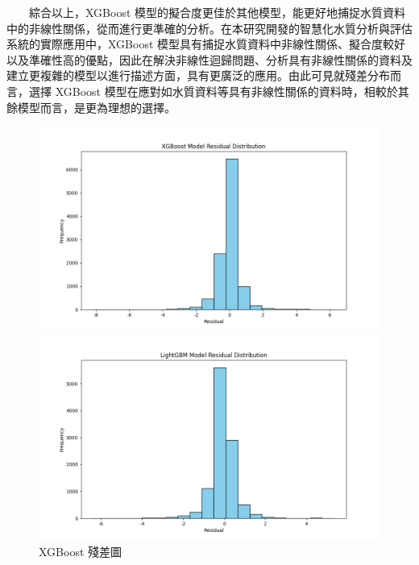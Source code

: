\documentclass[12pt,a4paper]{article}
\begin{document}
\begin{enumerate}
\begin{enumerate}[label=\arabic*.]
\begin{enumerate}[label=3-2-\arabic*.]
\begin{enumerate}[label=\Alph*.]
                　　綜合以上，XGBoost 模型的擬合度更佳於其他模型，能更好地捕捉水質資料中的非線性關係，從而進行更準確的分析。在本研究開發的智慧化水質分析與評估系統的實際應用中，XGBoost 模型具有捕捉水質資料中非線性關係、擬合度較好以及準確性高的優點，因此在解決非線性迴歸問題、分析具有非線性關係的資料及建立更複雜的模型以進行描述方面，具有更廣泛的應用。由此可見就殘差分布而言，選擇 XGBoost 模型在應對如水質資料等具有非線性關係的資料時，相較於其餘模型而言，是更為理想的選擇。
                    \begin{figure}[H]
                        \centering
                        \begin{minipage}{0.45\textwidth}
                            \centering
                            \includegraphics[width=\textwidth]{resources/image/ResidualPlot/XGBoost.png}
                            \caption{XGBoost 殘差圖}
                            \label{fig:residual_xgboost}
                        \end{minipage}
                        \begin{minipage}{0.45\textwidth}
                            \centering
                            \includegraphics[width=\textwidth]{resources/image/ResidualPlot/LightGBM.png}

\end{minipage}
\end{figure}
\end{enumerate}
\end{enumerate}
\end{enumerate}
\end{enumerate}
\end{document}
